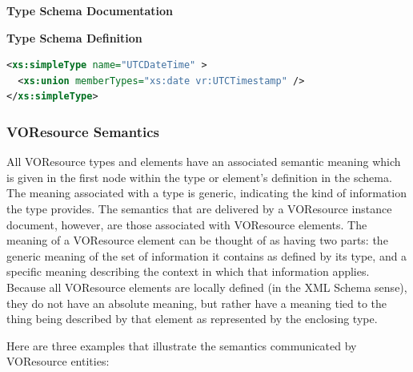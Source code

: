 \documentclass[11pt,a4paper]{ivoa}
\begin{document}
\begin{generated}
\begingroup
      	\renewcommand*\descriptionlabel[1]{%
      	\hbox to 5.5em{\emph{#1}\hfil}}\vspace{2ex}\noindent\textbf{ Type Schema Documentation}


\vspace{1ex}\noindent\textbf{ Type Schema Definition}

\begin{lstlisting}[language=XML,basicstyle=\footnotesize]
<xs:simpleType name="UTCDateTime" >
  <xs:union memberTypes="xs:date vr:UTCTimestamp" />
</xs:simpleType>
\end{lstlisting}\endgroup
\end{generated}


\subsubsection{VOResource Semantics}

All VOResource types and elements have an associated semantic meaning
which is given in the first 
node within the type or element's definition in the schema.  The
meaning associated with a type is generic, indicating the kind of
information the type provides.  The semantics that are delivered by a
VOResource instance document, however, are those associated with
VOResource elements.  The meaning of a VOResource element can be
thought of as having two parts:  the generic meaning of the set of
information it contains as defined by its type, and a specific meaning
describing the context in which that information applies.  Because all
VOResource elements are locally defined (in the XML Schema
sense), they do not have an absolute meaning, but rather have a
meaning tied to the thing being described by that element as
represented by the enclosing type.  

Here are three examples that illustrate the semantics communicated by
VOResource entities:
\end{document}
